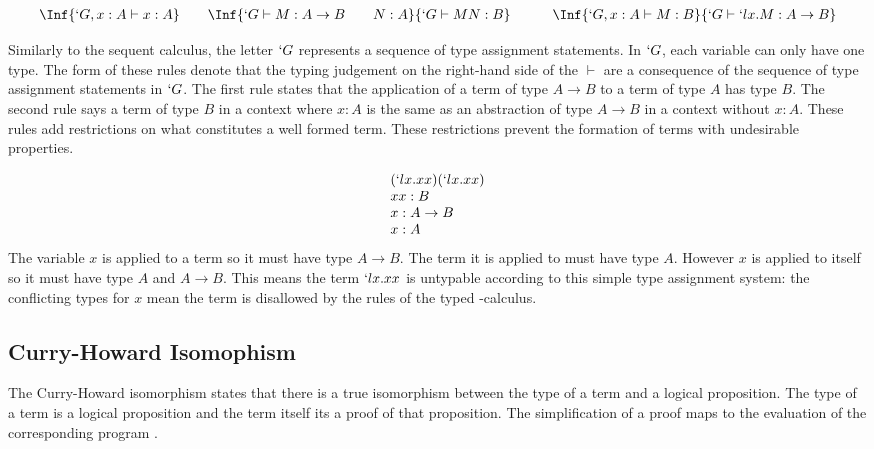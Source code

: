   \[
  \begin{array}{c@{\quad\quad}c@{\quad\quad\quad}c}
    \Inf{ `G,x:A \vdash x : A }
    &
    \Inf{
      `G \vdash M : A \to B \hspace{20pt} N:A 
    }{
      `G \vdash M N : B 
    }
    &
    \Inf{
      `G,x:A \vdash M : B
    }{
      `G \vdash `lx.M : A \to B 
    }
    \vspace{5pt}
    \end{array}
  \]
  Similarly to the sequent calculus, 
  the letter $`G$ represents a sequence of type assignment statements.
  In $`G$, each variable can only have one type.
  The form of these rules denote that the typing judgement on the right-hand side of the $\vdash$ are a consequence of the sequence of type assignment statements in $`G$.
  The first rule states that the application of a term of type $A \to B$ to
  a term of type $A$ has type $B$. 
  The second rule says a term of type $B$ in a context where $x:A$ is the same as an abstraction of type $A \to B$ in a context without $x:A$. 
  These rules add restrictions on what constitutes a well formed term.
  These restrictions prevent the formation of terms with undesirable properties.  
  
  \begin{example}
  \[  
  \begin{array}{lr}
    (`lx.xx)(`lx.xx) \\
    xx : B \\
    x : A \to B \\
    x : A
  \end{array}
  \]
  The variable $x$ is applied to a term so it must have type $A \to B$.
  The term it is applied to must have type $A$.
  However $x$ is applied to itself so it must have type $A$ and $A \to B$.
  This means the term $`lx.xx$ is untypable according to this simple type assignment system:
  the conflicting types for $x$ mean the term is disallowed by the rules of the typed \lam-calculus.
  \end{example}
 
  \subsection{Curry-Howard Isomophism}
  
  The Curry-Howard isomorphism states that there is a true isomorphism between the type of a term and a logical proposition. 
  The type of a term is a logical proposition and the term itself its a proof of that proposition.
  The simplification of a proof maps to the evaluation of the corresponding program \cite{Wadler15}.
  
